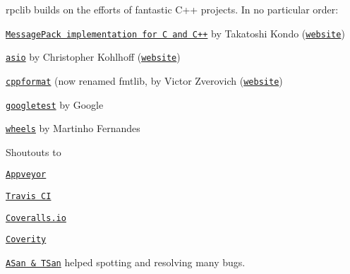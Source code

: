 {\ttfamily rpclib} builds on the efforts of fantastic C++ projects. In no particular order\+:


\begin{DoxyItemize}
\item \href{https://github.com/msgpack/msgpack-c}{\tt Message\+Pack implementation for C and C++} by Takatoshi Kondo (\href{http://msgpack.org/}{\tt website})
\item \href{https://github.com/chriskohlhoff/asio}{\tt asio} by Christopher Kohlhoff (\href{http://think-async.com/Asio}{\tt website})
\item \href{https://github.com/fmtlib/fmt}{\tt cppformat} (now renamed {\ttfamily fmtlib}, by Victor Zverovich (\href{http://fmtlib.net}{\tt website})
\item \href{https://github.com/google/googletest}{\tt googletest} by Google
\item \href{https://github.com/rmartinho/wheels}{\tt wheels} by Martinho Fernandes
\end{DoxyItemize}

Shoutouts to


\begin{DoxyItemize}
\item \href{https://www.appveyor.com/}{\tt Appveyor}
\item \href{https://travis-ci.org}{\tt Travis CI}
\item \href{https://coveralls.io/}{\tt Coveralls.\+io}
\item \href{http://www.coverity.com}{\tt Coverity}
\item \href{https://github.com/google/sanitizers}{\tt A\+San \& T\+San} helped spotting and resolving many bugs. 
\end{DoxyItemize}